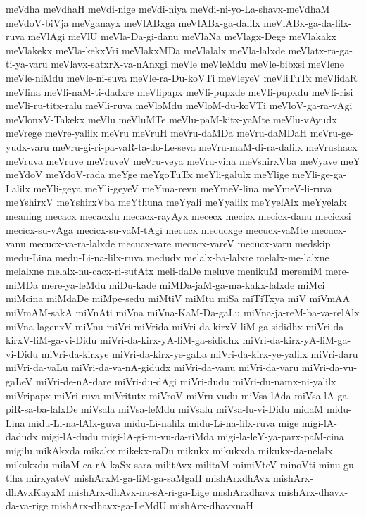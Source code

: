 {meVdha
meVdhaH
meVdi-nige
meVdi-niya
meVdi-ni-yo-La-shavx-meVdhaM
meVdoV-biVja
meVganayx
meVlABxga
meVlABx-ga-dalilx
meVlABx-ga-da-lilx-ruva
meVlAgi
meVlU
meVla-Da-gi-danu
meVlaNa
meVlagx-Dege
meVlakakx
meVlakekx
meVla-kekxVri
meVlakxMDa
meVlalalx
meVla-lalxde
meVlatx-ra-ga-ti-ya-varu
meVlavx-satxrX-va-nAnxgi
meVle
meVleMdu
meVle-bibxsi
meVlene
meVle-niMdu
meVle-ni-suva
meVle-ra-Du-koVTi
meVleyeV
meVliTuTx
meVlidaR
meVlina
meVli-naM-ti-dadxre
meVlipapx
meVli-pupxde
meVli-pupxdu
meVli-risi
meVli-ru-titx-ralu
meVli-ruva
meVloMdu
meVloM-du-koVTi
meVloV-ga-ra-vAgi
meVlonxV-Takekx
meVlu
meVluMTe
meVlu-paM-kitx-yaMte
meVlu-vAyudx
meVrege
meVre-yalilx
meVru
meVruH
meVru-daMDa
meVru-daMDaH
meVru-ge-yudx-varu
meVru-gi-ri-pa-vaR-ta-do-Le-seva
meVru-maM-di-ra-dalilx
meVrushacx
meVruva
meVruve
meVruveV
meVru-veya
meVru-vina
meVshirxVba
meVyave
meY
meYdoV
meYdoV-rada
meYge
meYgoTuTx
meYli-galulx
meYlige
meYli-ge-ga-Lalilx
meYli-geya
meYli-geyeV
meYma-revu
meYmeV-lina
meYmeV-li-ruva
meYshirxV
meYshirxVba
meYthuna
meYyali
meYyalilx
meYyelAlx
meYyelalx
meaning
mecacx
mecacxlu
mecacx-rayAyx
mececx
mecicx
mecicx-danu
mecicxsi
mecicx-su-vAga
mecicx-su-vaM-tAgi
mecucx
mecucxge
mecucx-vaMte
mecucx-vanu
mecucx-va-ra-lalxde
mecucx-vare
mecucx-vareV
mecucx-varu
medskip
medu-Lina
medu-Li-na-lilx-ruva
medudx
melalx-ba-lalxre
melalx-me-lalxne
melalxne
melalx-nu-cacx-ri-sutAtx
meli-daDe
meluve
menikuM
meremiM
mere-miMDa
mere-ya-leMdu
miDu-kade
miMDa-jaM-ga-ma-kakx-lalxde
miMci
miMcina
miMdaDe
miMpe-sedu
miMtiV
miMtu
miSa
miTiTxya
miV
miVmAA
miVmAM-sakA
miVnAti
miVna
miVna-KaM-Da-gaLu
miVna-ja-reM-ba-va-relAlx
miVna-lagenxV
miVnu
miVri
miVrida
miVri-da-kirxV-liM-ga-sididhx
miVri-da-kirxV-liM-ga-vi-Didu
miVri-da-kirx-yA-liM-ga-sididhx
miVri-da-kirx-yA-liM-ga-vi-Didu
miVri-da-kirxye
miVri-da-kirx-ye-gaLa
miVri-da-kirx-ye-yalilx
miVri-daru
miVri-da-vaLu
miVri-da-va-nA-gidudx
miVri-da-vanu
miVri-da-varu
miVri-da-vu-gaLeV
miVri-de-nA-dare
miVri-du-dAgi
miVri-dudu
miVri-du-namx-ni-yalilx
miVripapx
miVri-ruva
miVritutx
miVroV
miVru-vudu
miVsa-lAda
miVsa-lA-ga-piR-sa-ba-lalxDe
miVsala
miVsa-leMdu
miVsalu
miVsa-lu-vi-Didu
midaM
midu-Lina
midu-Li-na-lAlx-guva
midu-Li-nalilx
midu-Li-na-lilx-ruva
mige
migi-lA-dadudx
migi-lA-dudu
migi-lA-gi-ru-vu-da-riMda
migi-la-leY-ya-parx-paM-cina
migilu
mikAkxda
mikakx
mikekx-raDu
mikukx
mikukxda
mikukx-da-nelalx
mikukxdu
milaM-ca-rA-kaSx-sara
militAvx
militaM
mimiVteV
minoVti
minu-gu-tiha
mirxyateV
mishArxM-ga-liM-ga-saMgaH
mishArxdhAvx
mishArx-dhAvxKayxM
mishArx-dhAvx-nu-sA-ri-ga-Lige
mishArxdhavx
mishArx-dhavx-da-va-rige
mishArx-dhavx-ga-LeMdU
mishArx-dhavxnaH
}
